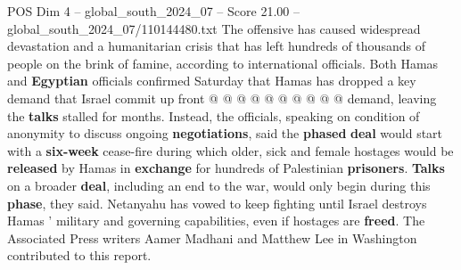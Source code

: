 \begin{textsample}{POS Dim 4 – global\_south\_2024\_07 – Score 21.00 – global\_south\_2024\_07/110144480.txt}
The offensive has caused widespread devastation and a humanitarian crisis that has left hundreds of thousands of people on the brink of famine, according to international officials.
Both Hamas and \textbf{Egyptian} officials confirmed Saturday that Hamas has dropped a key demand that Israel commit up front @ @ @ @ @ @ @ @ @ @ demand, leaving the \textbf{talks} stalled for months.
Instead, the officials, speaking on condition of anonymity to discuss ongoing \textbf{negotiations}, said the \textbf{phased} \textbf{deal} would start with a \textbf{six-week} cease-fire during which older, sick and female hostages would be \textbf{released} by Hamas in \textbf{exchange} for hundreds of Palestinian \textbf{prisoners}. \textbf{Talks} on a broader \textbf{deal}, including an end to the war, would only begin during this \textbf{phase}, they said.
Netanyahu has vowed to keep fighting until Israel destroys Hamas ' military and governing capabilities, even if hostages are \textbf{freed}.
The Associated Press writers Aamer Madhani and Matthew Lee in Washington contributed to this report.

\end{textsample}
